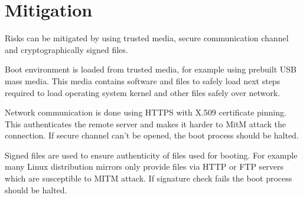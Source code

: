 \section{Mitigation}

Risks can be mitigated by using trusted media, secure communication
channel and cryptographically signed files.

Boot environment is loaded from trusted media, for example using
prebuilt USB mass media. This media contains software and files to
safely load next steps required to load operating system kernel and
other files safely over network.

Network communication is done using HTTPS with X.509 certificate
pinning. This authenticates the remote server and makes it harder to
MitM attack the connection. If secure channel can't be opened, the
boot process should be halted.

Signed files are used to ensure authenticity of files used for
booting. For example many Linux distribution mirrors only provide
files via HTTP or FTP servers which are susceptible to MITM attack. If
signature check fails the boot process should be halted.
